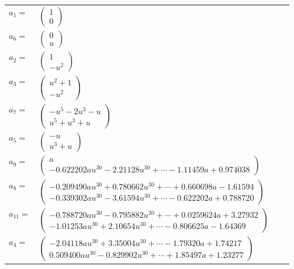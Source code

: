 \documentclass[1p]{elsarticle_modified}
\theoremstyle{definition}
\begin{document}
\begin{tabular}{m{7pt} m{180pt} m{7pt} m{180pt} }
\flushright $a_{1}=$&$\begin{pmatrix}1\\0\end{pmatrix}$ \\
\flushright $a_{6}=$&$\begin{pmatrix}0\\u\end{pmatrix}$ \\
\flushright $a_{2}=$&$\begin{pmatrix}1\\- u^2\end{pmatrix}$ \\
\flushright $a_{3}=$&$\begin{pmatrix}u^2+1\\- u^2\end{pmatrix}$ \\
\flushright $a_{7}=$&$\begin{pmatrix}- u^5-2 u^3- u\\u^5+u^3+u\end{pmatrix}$ \\
\flushright $a_{5}=$&$\begin{pmatrix}- u\\u^3+u\end{pmatrix}$ \\
\flushright $a_{9}=$&$\begin{pmatrix}a\\-0.622202 a u^{30}-2.21128 u^{30}+\cdots-1.11459 a+0.974038\end{pmatrix}$ \\
\flushright $a_{8}=$&$\begin{pmatrix}-0.209490 a u^{30}+0.780662 u^{30}+\cdots+0.660698 a-1.61594\\-0.339302 a u^{30}-3.61594 u^{30}+\cdots-0.622202 a+0.788720\end{pmatrix}$ \\
\flushright $a_{11}=$&$\begin{pmatrix}-0.788720 a u^{30}-0.795882 u^{30}+\cdots+0.0259624 a+3.27932\\-1.01253 a u^{30}+2.10654 u^{30}+\cdots-0.806625 a-1.64369\end{pmatrix}$ \\
\flushright $a_{4}=$&$\begin{pmatrix}-2.04118 a u^{30}+3.35004 u^{30}+\cdots-1.79320 a+1.74217\\0.509400 a u^{30}-0.829902 u^{30}+\cdots+1.85497 a+1.23277\end{pmatrix}$ \\

\end{tabular}
\end{document}
